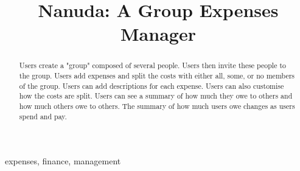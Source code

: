\documentclass[conference]{IEEEtran}
\begin{document}
\title{Nanuda: A Group Expenses Manager}

\author{
\and
{}
\and
{}
}

\maketitle

\begin{abstract}
Users create a "group" composed of several people. Users then invite these people to the group. Users add expenses and split the costs with either all, some, or no members of the group. Users can add descriptions for each expense. Users can also customise how the costs are split. Users can see a summary of how much they owe to others and how much others owe to others. The summary of how much users owe changes as users spend and pay.
\end{abstract}

\begin{IEEEkeywords}
expenses, finance, management
\end{IEEEkeywords}
\end{document}
